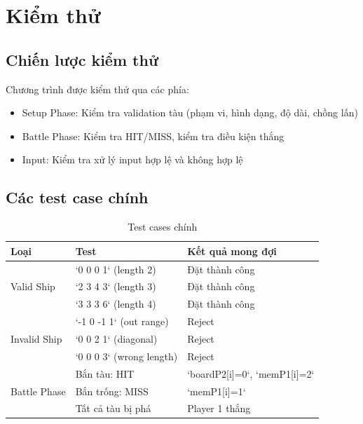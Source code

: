 
\section{Kiểm thử}

\subsection{Chiến lược kiểm thử}

Chương trình được kiểm thử qua các phía:
\begin{itemize}
    \item Setup Phase: Kiểm tra validation tàu (phạm vi, hình dạng, độ dài, chồng lấn)
    \item Battle Phase: Kiểm tra HIT/MISS, kiểm tra điều kiện thắng
    \item Input: Kiểm tra xử lý input hợp lệ và không hợp lệ
\end{itemize}

\subsection{Các test case chính}

\begin{table}[H]
\centering
\small
\begin{tabular}{|l|l|l|}
\hline
\textbf{Loại} & \textbf{Test} & \textbf{Kết quả mong đợi} \\
\hline
\multirow{3}{*}{Valid Ship} & `0 0 0 1` (length 2) & Đặt thành công \\
 & `2 3 4 3` (length 3) & Đặt thành công \\
 & `3 3 3 6` (length 4) & Đặt thành công \\
\hline
\multirow{3}{*}{Invalid Ship} & `-1 0 -1 1` (out range) & Reject \\
 & `0 0 2 1` (diagonal) & Reject \\
 & `0 0 0 3` (wrong length) & Reject \\
\hline
\multirow{3}{*}{Battle Phase} & Bắn tàu: HIT & `boardP2[i]=0`, `memP1[i]=2` \\
 & Bắn trống: MISS & `memP1[i]=1` \\
 & Tất cả tàu bị phá & Player 1 thắng \\
\hline
\end{tabular}
\caption{Test cases chính}
\end{table}
\hline

 \\
\hline

